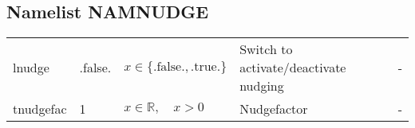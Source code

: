 \documentclass[twoside,11pt,fleqn,a4paper,english,openright]{report}
\begin{document}
\subsection{Namelist NAMNUDGE}\label{par:nudge}
\begin{center}
  \tablelasttail{
        &&&&\\\hline
  }
\begin{supertabular}{|l|p{1.6cm}|p{4cm}|p{6.5cm}|l|}
lnudge	& .false.	& $x\in\{\text{.false.},\text{.true.}\}$	& Switch to activate/deactivate nudging	& -\\
tnudgefac & 1	& $x \in \mathbb{R}, \quad x>0$	&	Nudgefactor & -\\
\end{supertabular}
\end{center}

\newpage 
\end{document}

